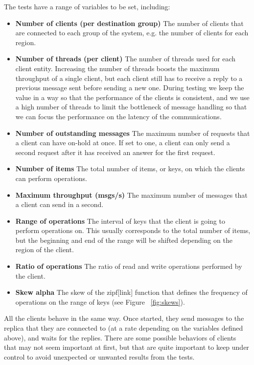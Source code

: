 The tests have a range of variables to be set, including:
\begin{itemize}
  \item \textbf{Number of clients (per destination group)} The number of clients that are connected to each group of the system, e.g. the number of clients for each region.
  \item \textbf{Number of threads (per client)} The number of threads used for each client entity. Increasing the number of threads boosts the maximum throughput of a single client, but each client still has to receive a reply to a previous message sent before sending a new one. During testing we keep the value in a way so that the performance of the clients is consistent, and we use a high number of threads to limit the bottleneck of message handling so that we can focus the performance on the latency of the communications.
  \item \textbf{Number of outstanding messages} The maximum number of requests that a client can have on-hold at once. If set to one, a client can only send a second request after it has received an answer for the first request.
  \item \textbf{Number of items} The total number of items, or keys, on which the clients can perform operations.
  \item \textbf{Maximum throughput (msgs/s)} The maximum number of messages that a client can send in a second.
  \item \textbf{Range of operations} The interval of keys that the client is going to perform operations on. This usually corresponds to the total number of items, but the beginning and end of the range will be shifted depending on the region of the client.
  \item \textbf{Ratio of operations} The ratio of read and write operations performed by the client.
  \item \textbf{Skew alpha} The skew of the zipf[link] function that defines the frequency of operations on the range of keys (see Figure ~\ref{fig:skews}).
\end{itemize}

All the clients behave in the same way. Once started, they send messages to the replica that they are connected to (at a rate depending on the variables defined above), and waits for the replies. There are some possible behaviors of clients that may not seem important at first, but that are quite important to keep under control to avoid unexpected or unwanted results from the tests.

